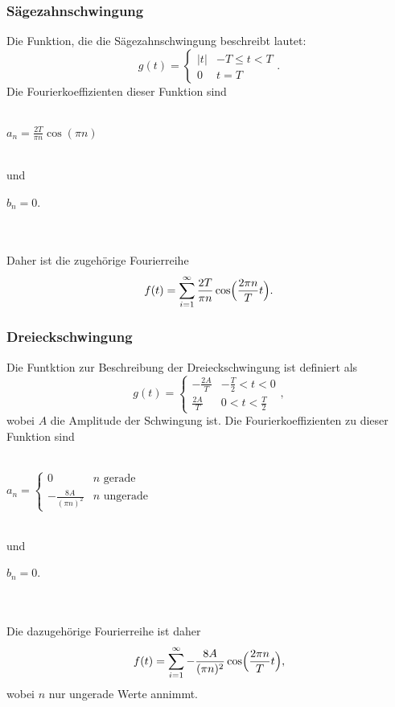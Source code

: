     \subsubsection{Sägezahnschwingung}
    Die Funktion, die die Sägezahnschwingung beschreibt lautet:
    \begin{equation}
    \label{eqn:saegezahn}
    g(t) = \begin{cases}
            \lvert t \rvert & -T \leq t < T \\
            0 & t = T 
            \end{cases}.
    \end{equation}
    Die Fourierkoeffizienten dieser Funktion sind
    \\ \\
    \centerline{$a_n = \frac{2T}{\pi n} \cos(\pi n)$}
    \\ 
    und 
    \\ 
    \centerline{$b_n = 0$.}
    \\ \\
    Daher ist die zugehörige Fourierreihe
    \begin{equation}
    \label{eqn:fouriersäge} 
    f(t) = \sum_{i=1}^{\infty} \frac{2 T}{\pi n} \cos \Bigl(\frac{ 2 \pi n}{T}t \Bigr).
    \end{equation}

    \subsubsection{Dreieckschwingung}
    Die Funtktion zur Beschreibung der Dreieckschwingung ist definiert als
    \begin{equation}
    \label{eqn:dreieck}
    g(t) = \begin{cases} 
            - \frac {2 A} {T} & - \frac {T}{2} < t < 0 \\
            \frac {2 A} {T} & 0 < t < \frac {T}{2}
            \end{cases},
    \end{equation}
    wobei $A$ die Amplitude der Schwingung ist.
    Die Fourierkoeffizienten zu dieser Funktion sind
    \\ \\
    \centerline{$a_n = \begin{cases}
                        0 & n \text{ gerade} \\
                        - \frac{8 A}{(\pi n)^2} & n \text{ ungerade} \end{cases}$}
                       \\
    und   
    \\      
    \centerline{$b_n = 0$.} 
    \\ \\      
    Die dazugehörige Fourierreihe ist daher
    \begin{equation}
    \label{eqn:fourierdrei}
    f(t) = \sum_{i=1}^{\infty} - \frac{8 A}{(\pi n)^2} \cos \Bigl(\frac{2 \pi n}{T}t \Bigr),    
    \end{equation}
    wobei $n$ nur ungerade Werte annimmt.
 


